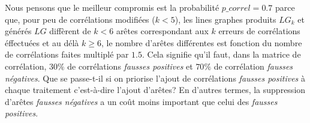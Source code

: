 Nous pensons que le meilleur compromis est la probabilit\'e $p\_correl = 0.7$ parce que, pour peu de corr\'elations modifi\'ees ($k<5$), les lines graphes produits $LG_k$ et g\'en\'er\'es $LG$ diff\`erent de $k<6$ ar\^etes correspondant aux $k$ erreurs de  corr\'elations \'effectu\'ees  et au d\'el\`a $k \geq 6$, le nombre d'ar\^etes diff\'erentes est fonction du nombre de corr\'elations faites multipl\'e par $1.5$.
Cela signifie qu'il faut, dans la matrice de corr\'elation, $30\%$ de corr\'elations {\em fausses positives} et $70\%$ de corr\'elation {\em fausses n\'egatives}. 
\newline
Que se passe-t-il si on priorise l'ajout de corr\'elations {\em fausses positives} \`a chaque traitement c'est-\`a-dire l'ajout d'ar\^etes?  
En d'autres termes, la suppression d'ar\^etes {\em fausses n\'egatives} a un co\^ut moins important que celui des {\em fausses positives}. 
